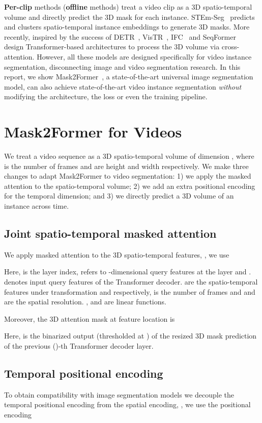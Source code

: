 \documentclass[10pt,twocolumn,letterpaper]{article}
\newcommand{\modelname}{Mask2Former\xspace}
\begin{document}
\noindent\textbf{Per-clip} methods (\aka \textbf{offline} methods) treat a video clip as a 3D spatio-temporal volume and directly predict the 3D mask for each instance. STEm-Seg~\cite{athar2020stem} predicts and clusters spatio-temporal instance embeddings to generate 3D masks. More recently, inspired by the success of DETR~\cite{detr}, VisTR~\cite{vistr}, IFC~\cite{ifc} and SeqFormer~\cite{wu2021seqformer} design Transformer-based architectures to process the 3D volume via cross-attention. However, all these models are designed specifically for video instance segmentation, disconnecting image and video segmentation research. In this report, we show Mask2Former~\cite{cheng2021mask2former}, a state-of-the-art universal image segmentation model, can also achieve state-of-the-art video instance segmentation \emph{without} modifying the architecture, the loss or even the training pipeline.


\section{\modelname for Videos}
We treat a video sequence as a 3D spatio-temporal volume of dimension , where  is the number of frames and  are height and width respectively. We make three changes to adapt \modelname  to video segmentation: 1) we apply the masked attention to the spatio-temporal volume; 2) we add an extra positional encoding for the temporal dimension; and 3) we directly predict a 3D volume of an instance across time.

\subsection{Joint spatio-temporal masked attention}
We apply masked attention to the 3D spatio-temporal features, \ie, we use

Here,  is the layer index,  refers to  -dimensional query features at the  layer and .  denotes input query features of the Transformer decoder.  are the spatio-temporal features under transformation  and  respectively,  is the number of frames and  and  are the spatial resolution. ,  and  are linear functions.

Moreover, the 3D attention mask  at feature location  is

Here,  is the binarized output (thresholded at ) of the resized 3D mask prediction of the previous ()-th Transformer decoder layer.

\subsection{Temporal positional encoding}
To obtain compatibility with image segmentation models we decouple the temporal positional encoding from the spatial  encoding, \ie, we use the positional encoding
\end{document}
